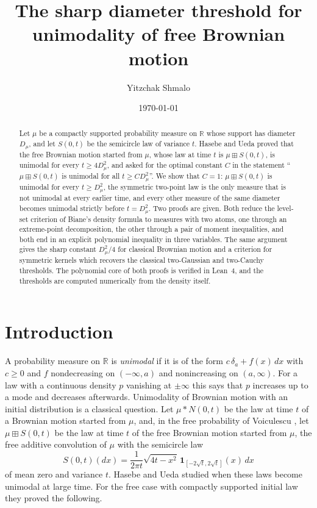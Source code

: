 \documentclass[11pt]{amsart}
\title[Sharp unimodality threshold for free Brownian motion]{The sharp diameter threshold for unimodality of free Brownian motion}
\author{Yitzchak Shmalo}
\date{\today}
\theoremstyle{definition}
\newcommand{\R}{\mathbb{R}}
\newcommand{\bp}{\boxplus}
\begin{document}
\begin{abstract}
Let $\mu$ be a compactly supported probability measure on $\R$ whose support has diameter $D_\mu$, and let $S(0,t)$ be the semicircle law of variance $t$. Hasebe and Ueda proved that the free Brownian motion started from $\mu$, whose law at time $t$ is $\mu\bp S(0,t)$, is unimodal for every $t\ge 4D_\mu^2$, and asked for the optimal constant $C$ in the statement ``$\mu\bp S(0,t)$ is unimodal for all $t\ge C D_\mu^2$''. We show that $C=1$: $\mu\bp S(0,t)$ is unimodal for every $t\ge D_\mu^2$, the symmetric two-point law is the only measure that is not unimodal at every earlier time, and every other measure of the same diameter becomes unimodal strictly before $t=D_\mu^2$. Two proofs are given. Both reduce the level-set criterion of Biane's density formula to measures with two atoms, one through an extreme-point decomposition, the other through a pair of moment inequalities, and both end in an explicit polynomial inequality in three variables. The same argument gives the sharp constant $D_\mu^2/4$ for classical Brownian motion and a criterion for symmetric kernels which recovers the classical two-Gaussian and two-Cauchy thresholds. The polynomial core of both proofs is verified in Lean~4, and the thresholds are computed numerically from the density itself.
\end{abstract}

\maketitle

\section{Introduction}

A probability measure on $\R$ is \emph{unimodal} if it is of the form $c\,\delta_a+f(x)\,dx$ with $c\ge 0$ and $f$ nondecreasing on $(-\infty,a)$ and nonincreasing on $(a,\infty)$. For a law with a continuous density $p$ vanishing at $\pm\infty$ this says that $p$ increases up to a mode and decreases afterwards. Unimodality of Brownian motion with an initial distribution is a classical question. Let $\mu*N(0,t)$ be the law at time $t$ of a Brownian motion started from $\mu$, and, in the free probability of Voiculescu \cite{Voiculescu86, NicaSpeicher}, let $\mu\bp S(0,t)$ be the law at time $t$ of the free Brownian motion started from $\mu$, the free additive convolution of $\mu$ with the semicircle law
\[
S(0,t)(dx)=\frac{1}{2\pi t}\sqrt{4t-x^2}\,\mathbf 1_{[-2\sqrt t,2\sqrt t]}(x)\,dx
\]
of mean zero and variance $t$. Hasebe and Ueda \cite{HasebeUeda} studied when these laws become unimodal at large time. For the free case with compactly supported initial law they proved the following.
\end{document}
